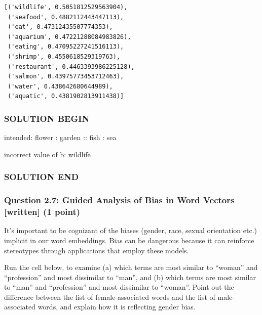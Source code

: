 \documentclass[11pt]{article}
\begin{document}
    \begin{Verbatim}[commandchars=\\\{\}]
[('wildlife', 0.5051812529563904),
 ('seafood', 0.4882112443447113),
 ('eat', 0.47312435507774353),
 ('aquarium', 0.47221288084983826),
 ('eating', 0.47095227241516113),
 ('shrimp', 0.4550618529319763),
 ('restaurant', 0.4463393986225128),
 ('salmon', 0.43975773453712463),
 ('water', 0.438642680644989),
 ('aquatic', 0.4381902813911438)]
    \end{Verbatim}

    \subsubsection{SOLUTION BEGIN}\label{solution-begin}

intended: flower : garden :: fish : sea

incorrect value of b: wildlife

\subsubsection{SOLUTION END}\label{solution-end}

    \subsubsection{Question 2.7: Guided Analysis of Bias in Word Vectors
{[}written{]} (1
point)}\label{question-2.7-guided-analysis-of-bias-in-word-vectors-written-1-point}

It's important to be cognizant of the biases (gender, race, sexual
orientation etc.) implicit in our word embeddings. Bias can be dangerous
because it can reinforce stereotypes through applications that employ
these models.

Run the cell below, to examine (a) which terms are most similar to
``woman'' and ``profession'' and most dissimilar to ``man'', and (b)
which terms are most similar to ``man'' and ``profession'' and most
dissimilar to ``woman''. Point out the difference between the list of
female-associated words and the list of male-associated words, and
explain how it is reflecting gender bias.
\end{document}

